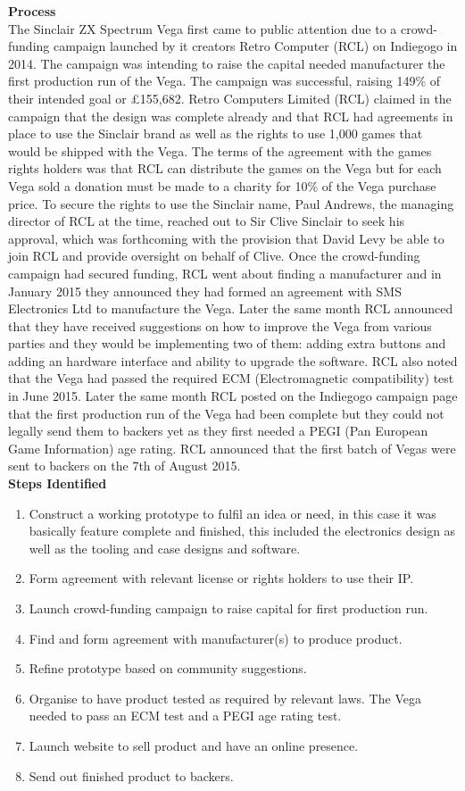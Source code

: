 \textbf{Process}\\
\label{Vega process}
The Sinclair ZX Spectrum Vega first came to public attention due to a crowd-funding campaign launched by it creators Retro Computer (RCL) on Indiegogo in 2014. The campaign was intending to raise the capital needed manufacturer the first production run of the Vega. The campaign was successful, raising 149\% of their intended goal or \pounds 155,682. Retro Computers Limited (RCL) claimed in the campaign that the design was complete already and that RCL had agreements in place to use the Sinclair brand as well as the rights to use 1,000 games that would be shipped with the Vega. The terms of the agreement with the games rights holders was that RCL can distribute the games on the Vega but for each Vega sold a donation must be made to a charity for 10\% of the Vega purchase price. To secure the rights to use the Sinclair name, Paul Andrews, the managing director of RCL at the time, reached out to Sir Clive Sinclair to seek his approval, which was forthcoming with the provision that David Levy be able to join RCL and provide oversight on behalf of Clive. Once the crowd-funding campaign had secured funding, RCL went about finding a manufacturer and in January 2015 they announced they had formed an agreement with SMS Electronics Ltd to manufacture the Vega. Later the same month RCL announced that they have received suggestions on how to improve the Vega from various parties and they would be implementing two of them: adding extra buttons and adding an hardware interface and ability to upgrade the software. RCL also noted that the Vega had passed the required ECM (Electromagnetic compatibility) test in June 2015. Later the same month RCL posted on the Indiegogo campaign page that the first production run of the Vega had been complete but they could not legally send them to backers yet as they first needed a PEGI (Pan European Game Information) age rating. RCL announced that the first batch of Vegas were sent to backers on the 7th of August 2015.\\

\textbf{Steps Identified}
\begin{enumerate}
\item Construct a working prototype to fulfil an idea or need, in this case it was basically feature complete and finished, this included the electronics design as well as the tooling and case designs and software. 
\item Form agreement with relevant license or rights holders to use their IP.
\item Launch crowd-funding campaign to raise capital for first production run.
\item Find and form agreement with manufacturer(s) to produce product.
\item Refine prototype based on community suggestions.
\item Organise to have product tested as required by relevant laws. The Vega needed to pass an ECM test and a PEGI age rating test.
\item Launch website to sell product and have an online presence.
\item Send out finished product to backers.
\end{enumerate} 


